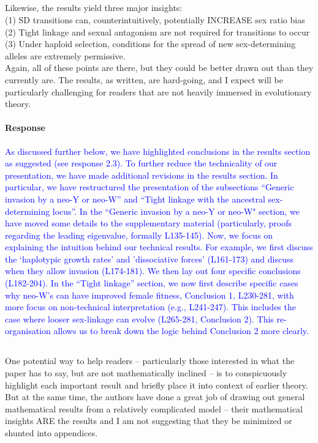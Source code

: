 \documentclass[10pt,letterpaper]{article}
\begin{document}
\noindent\subsection{}
Likewise, the results yield three major insights:\\
(1) SD transitions can, counterintuitively, potentially INCREASE sex ratio bias\\
(2) Tight linkage and sexual antagonism are not required for transitions to occur\\
(3) Under haploid selection, conditions for the spread of new sex-determining alleles are extremely permissive.\\
Again, all of these points are there, but they could be better drawn out than they currently are. The results, as written, are hard-going, and I expect will be particularly challenging for readers that are not heavily immersed in evolutionary theory.

\noindent\paragraph{Response}
\textcolor{blue}{
As discussed further below, we have highlighted conclusions in the results section as suggested (see response 2.3). 
To further reduce the technicality of our presentation, we have made additional revisions in the results section. 
In particular, we have restructured the presentation of the subsections ``Generic invasion by a neo-Y or neo-W'' and ``Tight linkage with the ancestral sex-determining locus''. 
In the ``Generic invasion by a neo-Y or neo-W" section, we have moved some details to the supplementary material (particularly, proofs regarding the leading eigenvalue, formally L135-145). 
Now, we focus on explaining the intuition behind our technical results.  
For example, we first discuss the `haplotypic growth rates' and 'dissociative forces' (L161-173) and discuss when they allow invasion (L174-181).
We then lay out four specific conclusions (L182-204). 
In the ``Tight linkage'' section, we now first describe specific cases why neo-W's can have improved female fitness, Conclusion 1, L230-281, with more focus on non-technical interpretation (e.g., L241-247). 
This includes the case where looser sex-linkage can evolve (L265-281, Conclusion 2). 
This re-organisation allows us to break down the logic behind Conclusion 2 more clearly. 
}

\noindent\subsection{}
One potential way to help readers -- particularly those interested in what the paper has to say, but are not mathematically inclined -- is to conspicuously highlight each important result and briefly place it into context of earlier theory. But at the same time, the authors have done a great job of drawing out general mathematical results from a relatively complicated model -- their mathematical insights ARE the results and I am not suggesting that they be minimized or shunted into appendices.
\end{document}
